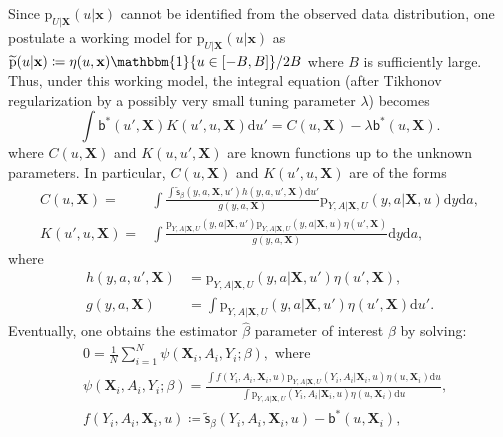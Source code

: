\documentclass{article}
\def\sfb{\mathsf{b}}
\def\sfb{\mathsf{b}}
\def\bfX{\mathbf{X}}
\def\bfx{\mathbf{x}}
\def\sfs{\mathsf{s}}
\theoremstyle{plain}
\theoremstyle{definition}
\theoremstyle{remark}
\def\diff{\mathrm{d}}
\def\hat{\widehat}
\def\tilde{\widetilde}
\def\p{\mathrm{p}}
\begin{document}
Since $\p_{U | \bfX} (u | \bfx)$ cannot be identified from the observed data distribution, one postulate a working model for $\p_{U | \bfX} (u | \bfx)$ as $\tilde{\p} (u| \bfx) \coloneqq \eta (u, \bfx) \mathbbm{1} \{u \in [-B, B]\} / 2 B$ where $B$ is sufficiently large. Thus, under this working model, the integral equation (after Tikhonov regularization by a possibly very small tuning parameter $\lambda$) becomes
\begin{equation*}
\int \sfb^\ast (u', \bfX) K (u', u, \bfX) \diff u' = C (u, \bfX) - \lambda \sfb^{\ast} (u, \bfX).
\end{equation*}
where $C (u, \bfX)$ and $K (u, u', \bfX)$ are known functions up to the unknown parameters. In particular, $C (u, \bfX)$ and $K (u', u, \bfX)$ are of the forms
\begin{equation*}
\begin{split}
C (u, \bfX)  = & \int \frac{\int \tilde{\sfs}_{\beta} (y, a, \bfX, u') h (y, a, u', \bfX) \diff u'}{g(y, a, \bfX)} \p_{Y, A | \bfX, U} (y, a | \bfX, u) \diff y \diff a ,\\
K (u', u, \bfX)  = & \int \frac{\p_{Y, A | \bfX, U} (y, a | \bfX, u') \p_{Y, A | \bfX, U} (y, a | \bfX, u)\eta (u', \bfX)}{g (y, a, \bfX)} \diff y \diff a ,
\end{split}
\end{equation*}
where
\begin{equation*}
\begin{split}
h (y, a, u', \bfX) & = \p_{Y, A | \bfX, U} (y, a | \bfX, u') \eta (u', \bfX), \\
g(y, a, \bfX) & = \int \p_{Y, A | \bfX, U} (y, a | \bfX, u') \eta (u', \bfX) \diff u'.
\end{split}
\end{equation*}
Eventually, one obtains the estimator $\hat{\beta}$ parameter of interest $\beta$ by solving:
\begin{equation*}
\begin{aligned}
& 0 = \frac{1}{N} \sum_{i = 1}^{N} \psi (\bfX_{i}, A_{i}, Y_{i}; \beta), \text{ where }\\
& \psi (\bfX_{i}, A_{i}, Y_{i}; \beta)  = \frac{\int f (Y_i,A_i,\bfX_i,u) \p_{Y, A | \bfX, U} (Y_{i}, A_{i} | \bfX_{i}, u) \eta (u, \bfX_{i}) \diff u}{\int \p_{Y, A | \bfX, U} (Y_{i}, A_{i} | \bfX_{i}, u) \eta (u, \bfX_{i}) \diff u},\\
& f (Y_i,A_i,\bfX_i,u) \coloneqq \tilde{\sfs}_{\beta} (Y_{i}, A_{i}, \bfX_{i}, u) - \sfb^{\ast} (u, \bfX_{i}),
\end{aligned}
\end{equation*}
\end{document}
